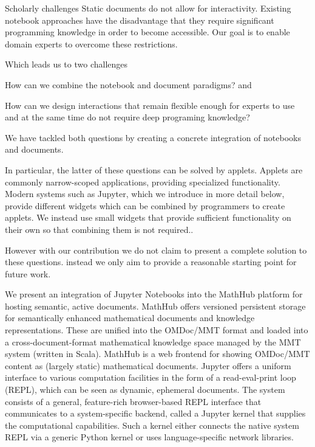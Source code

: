 \begin{newpart}{Scholarly challenges}
Static documents do not allow for interactivity. 
Existing notebook approaches have the disadvantage that they require significant programming knowledge in order to become accessible.
Our goal is to enable domain experts to overcome these restrictions. 

Which leads us to two challenges
\begin{compactenum}[\em i\rm )]
\item How can we combine the notebook and document paradigms?
and
\item How can we design interactions that remain flexible enough for experts to use and at the same time do not require deep programing knowledge?
\end{compactenum}

We have tackled both questions by creating a concrete integration of notebooks and documents. 

In particular, the latter of these questions can be solved by applets. 
Applets are commonly narrow-scoped applications, providing specialized functionality. 
Modern systems such as Jupyter, which we introduce in more detail below, provide different widgets which can be combined by programmers to create applets. 
We instead use small widgets that provide sufficient functionality on their own so that combining them is not required.. 

However with our contribution we do not claim to present a complete solution to these questions. 
instead we only aim to provide a reasonable starting point for future work. 
\end{newpart}

We present an integration of Jupyter Notebooks into the MathHub platform for hosting semantic, active documents.
MathHub offers versioned persistent storage for semantically enhanced mathematical documents and knowledge representations.
These are unified into the OMDoc/MMT format and loaded into a cross-document-format mathematical knowledge space managed by the MMT system (written in Scala).  
MathHub is a web frontend for showing OMDoc/MMT content as (largely static) mathematical documents.
Jupyter offers a uniform interface to various computation facilities in the form of a read-eval-print loop (REPL), which can be seen as dynamic, ephemeral documents.
The system consists of a general, feature-rich browser-based REPL interface that communicates to a system-specific backend, called a Jupyter kernel that supplies the computational capabilities.
Such a kernel either connects the native system REPL via a generic Python kernel or uses language-specific network libraries. 


